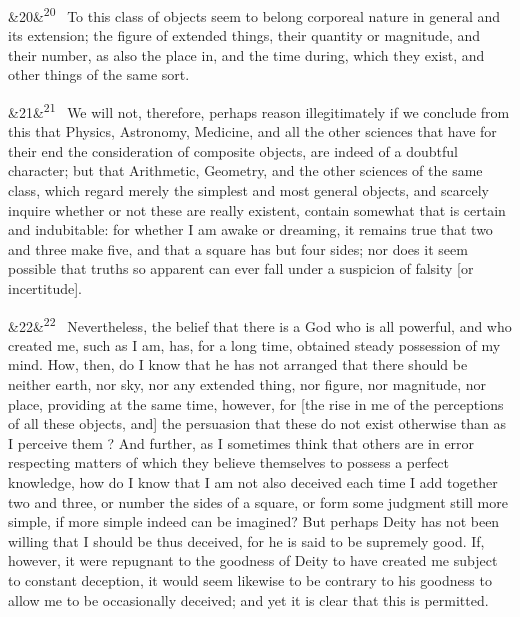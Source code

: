 \documentclass[12pt]{article}
\newcommand{\para}[1][]{\par\noindent\ifx&#1&\else\textsuperscript{\footnotesize #1}~\fi}
\begin{document}
\para[20] To this class of objects seem to belong corporeal nature in general and its extension; the figure of extended things, their quantity or magnitude, and their number, as also the place in, and the time during, which they exist, and other things of the same sort.

\para[21] We will not, therefore, perhaps reason illegitimately if we conclude from this that Physics, Astronomy, Medicine, and all the other sciences that have for their end the consideration of composite objects, are indeed of a doubtful character; but that Arithmetic, Geometry, and the other sciences of the same class, which regard merely the simplest and most general objects, and scarcely inquire whether or not these are really existent, contain somewhat that is certain and indubitable: for whether I am awake or dreaming, it remains true that two and three make five, and that a square has but four sides; nor does it seem possible that truths so apparent can ever fall under a suspicion of falsity [or incertitude].

\para[22] Nevertheless, the belief that there is a God who is all powerful, and who created me, such as I am, has, for a long time, obtained steady possession of my mind. How, then, do I know that he has not arranged that there should be neither earth, nor sky, nor any extended thing, nor figure, nor magnitude, nor place, providing at the same time, however, for [the rise in me of the perceptions of all these objects, and] the persuasion that these do not exist otherwise than as I perceive them ? And further, as I sometimes think that others are in error respecting matters of which they believe themselves to possess a perfect knowledge, how do I know that I am not also deceived each time I add together two and three, or number the sides of a square, or form some judgment still more simple, if more simple indeed can be imagined? But perhaps Deity has not been willing that I should be thus deceived, for he is said to be supremely good. If, however, it were repugnant to the goodness of Deity to have created me subject to constant deception, it would seem likewise to be contrary to his goodness to allow me to be occasionally deceived; and yet it is clear that this is permitted.
\end{document}
